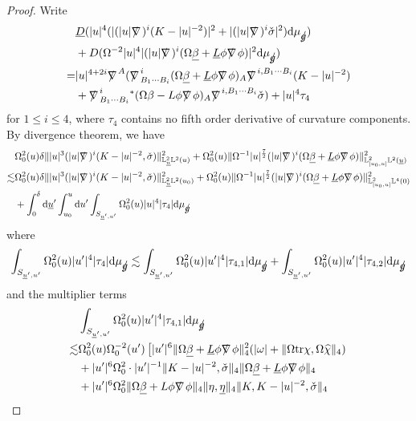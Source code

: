 \documentclass[11pt,reqno]{amsart}
\theoremstyle{definition}
\numberwithin{equation}{section}
\newcommand{\D}{\mathrm{d}}
\newcommand{\tr}{\mathrm{tr}}
\renewcommand{\L}{\mathbb{L}}
\def\betab{\underline{\beta}}
\def\chib{\underline{\chi}}
\def\chih{\widehat{\chi}}
\def\etab{\underline{\eta}}
\def\Lb{\underline{L}}
\def\tr{\mathrm{tr}}
\def\sigmac{\check{\sigma}}
\def\ub{\underline{u}}
\newcommand{\Db}{\underline{D}}
\def\nablas{\mbox{$\nabla \mkern -13mu /$ }}
\def\gs{\mbox{$g \mkern -9mu /$}}
\begin{document}
\begin{proof}
Write
\begin{align*}
&\Db(|u|^4(|(|u|\nablas)^i(K-|u|^{-2})|^2+|(|u|\nablas)^i\check{\sigma}|^2)\D\mu_{\gs})\\
&+D(\Omega^{-2}|u|^4|(|u|\nablas)^i(\Omega\betab+\Lb\phi\nablas\phi)|^2\D\mu_{\gs})\\
=&|u|^{4+2i}\nablas^A(\nablas^i_{B_1\cdots B_i}(\Omega\betab+\Lb\phi\nablas\phi)_A\nablas^{i,B_1\cdots B_i}(K-|u|^{-2})\\&+\nablas^i_{B_1\cdots B_i}{}^*(\Omega\beta-L\phi\nablas\phi)_A\nablas^{i,B_1\cdots B_i}\sigmac)+|u|^4\tau_{4}
\end{align*}
for $1\le i\le4$, where $\tau_4$ contains no fifth order derivative of curvature components. %
By divergence theorem, we have
\begin{align*}
&\Omega_0^2(u)\delta\||u|^3(|u|\nablas)^i(K-|u|^{-2},\sigmac)\|_{\L^2_{\ub}\L^2(u)}^2+\Omega_0^2(u)\|\Omega^{-1}|u|^{\frac{7}{2}}(|u|\nablas)^i(\Omega\betab+\Lb\phi\nablas\phi)\|_{\L^2_{[u_0,u]}\L^2(\ub)}^2\\
\lesssim&\Omega_0^2(u)\delta\||u|^3(|u|\nablas)^i(K-|u|^{-2},\sigmac)\|_{\L^2_{\ub}\L^2(u_0)}^2+\Omega_0^2(u)\|\Omega^{-1}|u|^{\frac{7}{2}}(|u|\nablas)^i(\Omega\betab+\Lb\phi\nablas\phi)\|_{\L^2_{[u_0,u]}\L^4(0)}^2\\
&+\int_0^{\delta}\D\ub'\int_{u_0}^u\D u'\int_{S_{\ub',u'}}\Omega_0^2(u)|u|^4|\tau_4|\D\mu_{\gs}
\end{align*}
where
\begin{align*}
\int_{S_{\ub',u'}}\Omega_0^2(u)|u'|^4|\tau_4|\D\mu_{\gs}\lesssim\int_{S_{\ub',u'}}\Omega_0^2(u)|u'|^4|\tau_{4,1}|\D\mu_{\gs}+\int_{S_{\ub',u'}}\Omega_0^2(u)|u'|^4|\tau_{4,2}|\D\mu_{\gs}
\end{align*}
and the multiplier terms
\begin{equation}\label{tau41}
\begin{split}
&\int_{S_{\ub',u'}}\Omega_0^2(u)|u'|^4|\tau_{4,1}|\D\mu_{\gs}\\
\lesssim&\Omega_0^2(u)\Omega_0^{-2}(u')\left[|u'|^6\|\Omega\betab+\Lb\phi\nablas\phi\|_4^2(|\omega|+\|\Omega\tr\chi,\Omega\chih\|_4)\right.\\
&+|u'|^6\Omega_0^2\cdot|u'|^{-1}\|K-|u|^{-2},\check{\sigma}\|_4\|\Omega\betab+\Lb\phi\nablas\phi\|_4\\
&+|u'|^6\Omega_0^2\|\Omega\betab+L\phi\nablas\phi\|_4\|\eta,\etab\|_4\|K,K-|u|^{-2},\check{\sigma}\|_4\\

\end{split}
\end{equation}
\end{proof}
\end{document}
